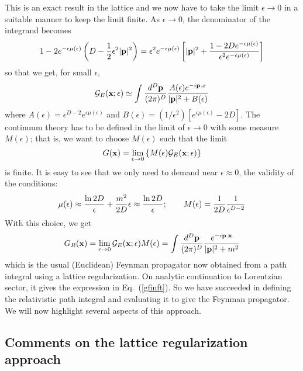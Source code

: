 \documentclass{article}
\def\eq#1{{Eq.~(\ref{#1})}}
\begin{document}
This is an exact result in the lattice and we now have to
take the limit $\epsilon\to 0$ in a suitable manner to keep the limit finite. 
As $\epsilon\to 0$, the denominator of the integrand
becomes
\begin{eqnarray} 
 1-2e^{-\epsilon\mu(\epsilon)}
\left( D-{1\over 2}\epsilon^2|{\mathbf p}|^2\right)=
 \epsilon^2 e^{-\epsilon\mu(\epsilon)}
\left[|{\mathbf p}|^2+
{1-2De^{-\epsilon\mu(\epsilon)}\over \epsilon^2 e^{-\epsilon\mu(\epsilon)}}\right]
 \end{eqnarray}
so that we  get, for small $\epsilon$,
\begin{equation} 
{\cal G}_E({\mathbf x};\epsilon)\simeq
\int{d^D{\mathbf p}\over (2\pi)^D}
{A(\epsilon)e^{-i{\mathbf p.x}}\over |{\mathbf p}|^2+B(\epsilon)} 
\end{equation} 
where
$ 
 A(\epsilon)= \epsilon^{D-2}e^{\epsilon\mu(\epsilon)}
 $
 and
 $
B(\epsilon)=(1/ \epsilon^2)
[e^{\epsilon\mu(\epsilon)}-2D].
$
The continuum theory has to be defined in the limit of
$\epsilon\to 0$ with some measure $M(\epsilon)$; that is, we want to choose $M(\epsilon)$ such that the limit
\begin{equation} 
G({\mathbf x})=
\lim_{\epsilon\to 0}
\left\{M(\epsilon){\cal G}_E({\mathbf x};\epsilon)\right\} 
\end{equation} 
is finite. It is easy to see that 
we only need to demand
 near $\epsilon\approx 0$, the validity of the conditions:
\begin{equation}
 \mu(\epsilon)\approx {\ln 2D\over \epsilon}
+{m^2\over 2D}\epsilon
\approx {\ln 2D\over \epsilon}; \qquad M(\epsilon)={1\over 2D}{1\over \epsilon^{D-2}} 
\label{qmeas}
\end{equation} 
 With this choice, we get
\begin{equation} 
G_R(\mathbf{x})=\lim_{\epsilon\to 0}{\cal G}_E
({\mathbf x};\epsilon)M(\epsilon)=\int
{d^D{\mathbf p}\over(2\pi)^D}
{e^{-i\mathbf{ p.x}}\over |{\mathbf p}|^2+m^2} 
\label{eightfour}
\end{equation} 
which is the usual (Euclidean) Feynman propagator now obtained from a path integral using a lattice regularization. On analytic continuation to Lorentzian sector, it gives the expression in \eq{gfinft}. So we have succeeded in defining the relativistic path integral and evaluating it to give the Feynman propagator. We will now highlight several aspects of this approach.

\subsection{Comments on the lattice regularization approach}\label{sec:comlattice}
\end{document}
